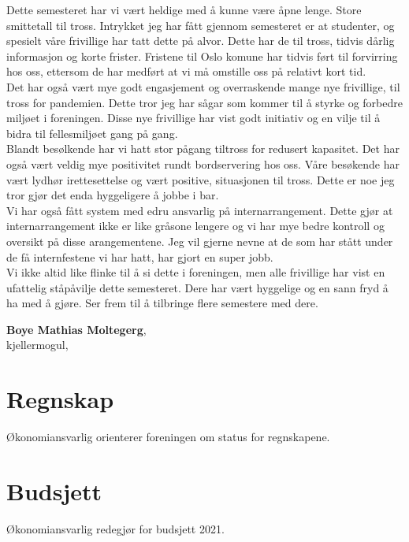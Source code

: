 \documentclass[10pt,norsk,a4paper]{article}
\begin{document}
\begin{multicols}{2}
Dette semesteret har vi vært heldige med å kunne være åpne 
lenge. Store smittetall til tross. Intrykket jeg har fått 
gjennom semesteret er at studenter, og spesielt våre frivillige 
har tatt dette på alvor. Dette har de til tross, tidvis 
dårlig informasjon og korte frister. Fristene til Oslo komune 
har tidvis ført til forvirring hos oss, ettersom de har medført 
at vi må omstille oss på relativt kort tid.\\
Det har også vært mye godt engasjement og overraskende mange 
nye frivillige, til tross for pandemien. Dette tror jeg har 
sågar som kommer til å styrke og forbedre miljøet i foreningen. 
Disse nye frivillige har vist godt initiativ og en vilje til 
å bidra til fellesmiljøet gang på gang. \\ 
Blandt besølkende har vi hatt stor pågang tiltross for redusert 
kapasitet. Det har også vært veldig mye positivitet rundt 
bordservering hos oss. Våre besøkende har vært lydhør 
irettesettelse og vært positive, situasjonen til tross. Dette 
er noe jeg tror gjør det enda hyggeligere å jobbe i bar.\\
Vi har også fått system med edru ansvarlig på internarrangement. 
Dette gjør at internarrangement ikke er like gråsone lengere 
og vi har mye bedre kontroll og oversikt på disse arangementene. 
Jeg vil gjerne nevne at de som har stått under de få internfestene 
vi har hatt, har gjort en super jobb. \\
Vi ikke altid like flinke til å si dette i foreningen, men alle 
frivillige har vist en ufattelig ståpåvilje dette semesteret. 
Dere har vært hyggelige og en sann fryd å ha med å gjøre. Ser 
frem til å tilbringe flere semestere med dere.\\

\end{multicols}
\textbf{Boye Mathias Moltegerg}, \\
kjellermogul, \date{\emph{26. november 2020}}

\section{Regnskap}
Økonomiansvarlig orienterer foreningen om status for regnskapene.

\section{Budsjett}
Økonomiansvarlig redegjør for budsjett 2021.
\end{document}
